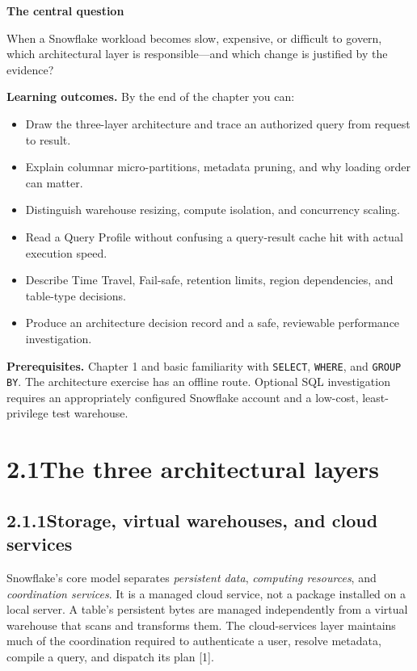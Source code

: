 \documentclass[11pt,twoside]{article}
\newcommand{\topic}[2]{\subsection*{#1\quad #2}}
\begin{document}
\begin{insight}
\textbf{The central question}\par
When a Snowflake workload becomes slow, expensive, or difficult to govern, which architectural layer is responsible---and which change is justified by the evidence?
\end{insight}
\textbf{Learning outcomes.} By the end of the chapter you can:
\begin{itemize}
\item Draw the three-layer architecture and trace an authorized query from request to result.
\item Explain columnar micro-partitions, metadata pruning, and why loading order can matter.
\item Distinguish warehouse resizing, compute isolation, and concurrency scaling.
\item Read a Query Profile without confusing a query-result cache hit with actual execution speed.
\item Describe Time Travel, Fail-safe, retention limits, region dependencies, and table-type decisions.
\item Produce an architecture decision record and a safe, reviewable performance investigation.
\end{itemize}
\textbf{Prerequisites.} Chapter 1 and basic familiarity with \texttt{SELECT}, \texttt{WHERE}, and \texttt{GROUP BY}. The architecture exercise has an offline route. Optional SQL investigation requires an appropriately configured Snowflake account and a low-cost, least-privilege test warehouse.


\newpage
\section*{2.1\quad The three architectural layers}
\topic{2.1.1}{Storage, virtual warehouses, and cloud services}
Snowflake's core model separates \emph{persistent data}, \emph{computing resources}, and \emph{coordination services}. It is a managed cloud service, not a package installed on a local server. A table's persistent bytes are managed independently from a virtual warehouse that scans and transforms them. The cloud-services layer maintains much of the coordination required to authenticate a user, resolve metadata, compile a query, and dispatch its plan [1].
\end{document}
